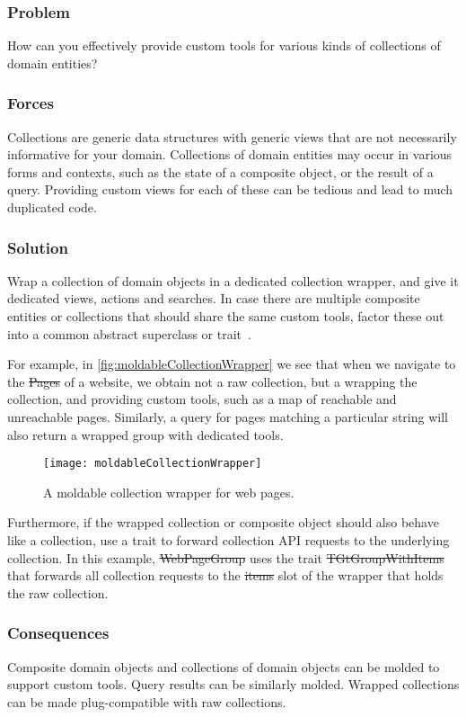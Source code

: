 \documentclass[sigconf]{acmart}
\begin{document}
\subsubsection*{Problem}
How can you effectively provide custom tools for various kinds of collections of domain entities?

\subsubsection*{Forces}
Collections are generic data structures with generic views that are not necessarily informative for your domain.
Collections of domain entities may occur in various forms and contexts, such as the state of a composite object, or the result of a query.
Providing custom views for each of these can be tedious and lead to much duplicated code.

\subsubsection*{Solution}
Wrap a collection of domain objects in a dedicated collection wrapper, and give it dedicated views, actions and searches.
In case there are multiple composite entities or collections that should share the same custom tools, factor these out into a common abstract superclass or trait~\cite{Duca06b}.

For example, in \autoref{fig:moldableCollectionWrapper} we see that when we navigate to the \st{Pages} of a website, we obtain not a raw collection, but a  wrapping the collection, and providing custom tools, such as a map of reachable and unreachable pages.
Similarly, a query for pages matching a particular string will also return a wrapped group with dedicated tools.

\begin{figure}[h]
  \texttt{[image: moldableCollectionWrapper]}
  \caption{A moldable collection wrapper for web pages.}
  \label{fig:moldableCollectionWrapper}
\end{figure}

Furthermore, if the wrapped collection or composite object should also behave like a collection, use a trait to forward collection API requests to the underlying collection.
In this example, \st{WebPageGroup} uses the trait \st{TGtGroupWithItems} that forwards all collection requests to the \st{items} slot of the wrapper that holds the raw collection.

\subsubsection*{Consequences}
Composite domain objects and collections of domain objects can be molded to support custom tools.
Query results can be similarly molded.
Wrapped collections can be made plug-compatible with raw collections.
\end{document}
